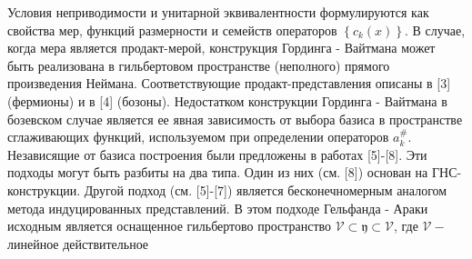 \documentclass[10pt]{article}
\begin{document}
Условия неприводимости и унитарной эквивалентности формулируются как свойства мер, функций размерности и семейств операторов $\left\{c_{k}(x)\right\}$. В случае, когда мера является продакт-мерой, конструкция Гординга - Вайтмана может быть реализована в гильбертовом пространстве (неполного) прямого произведения Неймана. Соответствующие продакт-представления описаны в [3] (фермионы) и в [4] (бозоны). Недостатком конструкции Гординга - Вайтмана в бозевском случае является ее явная зависимость от выбора базиса в пространстве сглаживающих функций, используемом при определении операторов $a_{k}^{\#}$. Независящие от базиса построения были предложены в работах [5]-[8]. Эти подходы могут быть разбиты на два типа. Один из них (см. [8]) основан на ГНС-конструкции. Другой подход (см. [5]-[7]) является бесконечномерным аналогом метода индуцированных представлений. В этом подходе Гельфанда - Араки исходным является оснащенное гильбертово пространство $\mathscr{V} \subset \mathfrak{y} \subset \mathscr{V}$, где $\mathscr{V}-$ линейное действительное
\end{document}
